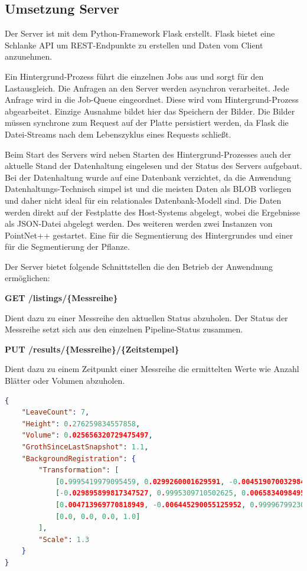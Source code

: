 \documentclass[12pt,titlepage, twoside]{article}
\begin{document}
\subsection{Umsetzung Server}
\label{sec:realisierung:implementierung4}

Der Server ist mit dem Python-Framework Flask erstellt. Flask bietet eine Schlanke API um REST-Endpunkte zu erstellen und Daten vom Client anzunehmen. 

Ein Hintergrund-Prozess führt die einzelnen Jobs aus und sorgt für den Lastausgleich. Die Anfragen an den Server werden asynchron verarbeitet. 
Jede Anfrage wird in die Job-Queue eingeordnet. Diese wird vom Hintergrund-Prozess abgearbeitet.
Einzige Ausnahme bildet hier das Speichern der Bilder. Die Bilder müssen synchrone zum Request auf der Platte persistiert werden, da Flask die Datei-Streams nach dem Lebenszyklus eines Requests schließt.

Beim Start des Servers wird neben Starten des Hintergrund-Prozesses auch der aktuelle Stand der Datenhaltung eingelesen und der Status des Servers aufgebaut. 
Bei der Datenhaltung wurde auf eine Datenbank verzichtet, da die Anwendung Datenhaltungs-Technisch simpel ist und die meisten Daten als BLOB \cite{sears2007blob} vorliegen und daher nicht ideal für ein relationales Datenbank-Modell sind. 
Die Daten werden direkt auf der Festplatte des Host-Systems abgelegt, wobei die Ergebnisse als JSON-Datei abgelegt werden.
Des weiteren werden zwei Instanzen von PointNet++ gestartet. Eine für die Segmentierung des Hintergrundes und einer für die Segmentierung der Pflanze.

Der Server bietet folgende Schnittstellen die den Betrieb der Anwendnung ermöglichen:

\textbf{GET /listings/\{Messreihe\}}

Dient dazu zu einer Messreihe den aktuellen Status abzuholen. Der Status der Messreihe setzt sich aus den einzelnen Pipeline-Status zusammen.

\textbf{PUT /results/\{Messreihe\}/\{Zeitstempel\}}

Dient dazu zu einem Zeitpunkt einer Messreihe die ermittelten Werte wie Anzahl Blätter oder Volumen abzuholen.

\begin{lstlisting}[language=json, caption={Beispiel Ergebnisse eines Zeitstempels}, captionpos=b, label=listing:example:result]
{
    "LeaveCount": 7,
    "Height": 0.276259834557858,
    "Volume": 0.025656320729475497,
    "GrothSinceLastSnapshot": 1.1,
    "BackgroundRegistration": {
        "Transformation": [
            [0.9995419979095459, 0.0299260001629591, -0.004519070032984018, -0.030479200184345245], 
            [-0.029895899817347527, 0.9995309710502625, 0.0065834098495543, 0.025272000581026077], 
            [0.004713969770818949, -0.006445290055125952, 0.9999679923057556, 0.0013244400033727288], 
            [0.0, 0.0, 0.0, 1.0]
        ],
        "Scale": 1.3
    }
}
\end{lstlisting}
\end{document}
